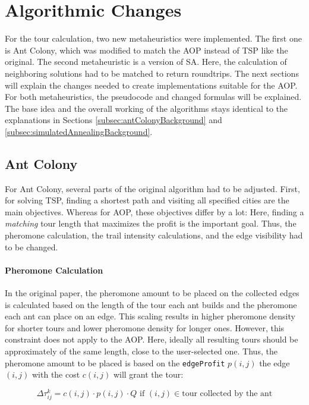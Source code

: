 \section{Algorithmic Changes}
\label{sec:algorithmicChanges}

For the tour calculation, two new metaheuristics were implemented.
The first one is Ant Colony, which was modified to match the AOP instead of TSP like the original.
The second metaheuristic is a version of SA.
Here, the calculation of neighboring solutions had to be matched to return roundtrips.
The next sections will explain the changes needed to create implementations suitable for the AOP.
For both metaheuristics, the pseudocode and changed formulas will be explained.
The base idea and the overall working of the algorithms stays identical to the explanations in Sections \ref{subsec:antColonyBackground} and \ref{subsec:simulatedAnnealingBackground}.


\subsection{Ant Colony}
\label{subsec:antColonyImplementation}

For Ant Colony, several parts of the original algorithm had to be adjusted. 
First, for solving TSP, finding a shortest path and visiting all specified cities are the main objectives.
Whereas for AOP, these objectives differ by a lot:
Here, finding a \textit{matching} tour length that maximizes the profit is the important goal. 
Thus, the pheromone calculation, the trail intensity calculations, and the edge visibility had to be changed.

\paragraph{Pheromone Calculation}

In the original paper, the pheromone amount to be placed on the collected edges is calculated based on the length of the tour each ant builds and the pheromone each ant can place on an edge. 
This scaling results in higher pheromone density for shorter tours and lower pheromone density for longer ones.
However, this constraint does not apply to the AOP.
Here, ideally all resulting tours should be approximately of the same length, close to the user-selected one.
Thus, the pheromone amount to be placed is based on the \texttt{edgeProfit} $p(i,j)$ the edge $(i,j)$ with the cost $c(i,j)$ will grant the tour:


\begin{equation}
	\label{eq:newPheromoneCalc}
	\Delta\tau_{ij}^k = c(i,j) \cdot p(i,j) \cdot Q \text{ if }(i,j) \in \text{tour collected by the ant}
\end{equation}

